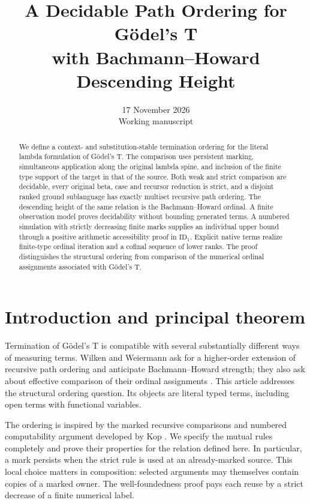 \documentclass[11pt,a4paper]{article}
\title{A Decidable Path Ordering for G\"odel's T\\
with Bachmann--Howard Descending Height}
\author{}
\date{17 November 2026\\Working manuscript}
\theoremstyle{definition}
\newcommand{\ID}{\mathrm{ID}_1}
\begin{document}
\maketitle
\begin{abstract}
We define a context- and substitution-stable termination ordering for the
literal lambda formulation of G\"odel's T. The comparison uses persistent
marking, simultaneous application along the original lambda spine, and
inclusion of the finite type support of the target in that of the source.
Both weak and strict comparison are decidable, every original beta, case
and recursor reduction is strict, and a disjoint ranked ground sublanguage
has exactly multiset recursive path ordering. The descending height of the
same relation is the Bachmann--Howard ordinal. A finite observation model
proves decidability without bounding generated terms. A numbered simulation
with strictly decreasing finite marks supplies an individual upper bound
through a positive arithmetic accessibility proof in $\ID$. Explicit native
terms realize finite-type ordinal iteration and a cofinal sequence of lower
ranks. The proof distinguishes the structural ordering from comparison of
the numerical ordinal assignments associated with G\"odel's T.
\end{abstract}
\tableofcontents

\section{Introduction and principal theorem}
Termination of G\"odel's T is compatible with several substantially
different ways of measuring terms. Wilken and Weiermann ask for a
higher-order extension of recursive path ordering and anticipate
Bachmann--Howard strength; they also ask about effective comparison of
their ordinal assignments \cite[Introduction]{ww}. This article addresses
the structural ordering question. Its objects are literal typed terms,
including open terms with functional variables.

The ordering is inspired by the marked recursive comparisons and numbered
computability argument developed by Kop \cite[Chapter~5]{kop}. We specify
the mutual rules completely and prove their properties for the relation
defined here. In particular, a mark persists when the strict rule is used
at an already-marked source. This local choice matters in composition:
selected arguments may themselves contain copies of a marked owner.
The well-foundedness proof pays each reuse by a strict decrease of a
finite numerical label.
\end{document}
